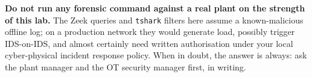 \documentclass[11pt,a4paper]{article}
\begin{document}
\begin{warnbox}
\textbf{Do not run any forensic command against a real plant on the strength of this lab.} The Zeek queries and \texttt{tshark} filters here assume a known-malicious offline log; on a production network they would generate load, possibly trigger IDS-on-IDS, and almost certainly need written authorisation under your local cyber-physical incident response policy. When in doubt, the answer is always: ask the plant manager and the OT security manager first, in writing.
\end{warnbox}
\end{document}
